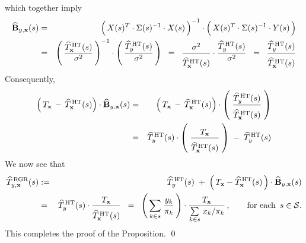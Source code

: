 which together imply
\begin{eqnarray*}
\widehat{\mathbf{B}}_{y,\mathbf{x}}(s)
& = &
	\left(\,X(s)^{T} \overset{{\color{white}!}}{\cdot} \Sigma(s)^{-1} \cdot X(s)\,\right)^{-1}
	\cdot
	\left(\,X(s)^{T} \overset{{\color{white}!}}{\cdot} \Sigma(s)^{-1} \cdot Y(s) \,\right)
\\
& = &
	\left(\, \dfrac{ \widehat{T}^{\,\textnormal{HT}}_{\mathbf{x}}(s) }{\sigma^{2}} \,\right)^{-1}
	\cdot
	\left(\,
		\dfrac{\widehat{T}^{\,\textnormal{HT}}_{y}(s)}{\sigma^{2}}
	\,\right)
\;\; = \;\;
	\dfrac{\sigma^{2}}{\overset{{\color{white}.}}{\widehat{T}^{\,\textnormal{HT}}_{\mathbf{x}}(s)}}
	\cdot
	\dfrac{\widehat{T}^{\,\textnormal{HT}}_{y}(s)}{\sigma^{2}}
\;\; = \;\;
	\dfrac{
		\widehat{T}^{\,\textnormal{HT}}_{y}(s)
	}{
		\overset{{\color{white}.}}{\widehat{T}^{\,\textnormal{HT}}_{\mathbf{x}}(s)}
	}
\end{eqnarray*}
Consequently,
\begin{eqnarray*}
\left(\,T_{\mathbf{x}} \,-\, \widehat{T}^{\,\textnormal{HT}}_{\mathbf{x}}(s)\right)
\cdot
\widehat{\mathbf{B}}_{y,\mathbf{x}}(s)
& = &
	\left(\,T_{\mathbf{x}} \,-\, \widehat{T}^{\,\textnormal{HT}}_{\mathbf{x}}(s)\right)
	\cdot
	\left(\;
		\dfrac{
			\widehat{T}^{\,\textnormal{HT}}_{y}(s)
		}{
			\overset{{\color{white}.}}{\widehat{T}^{\,\textnormal{HT}}_{\mathbf{x}}(s)}
		}
	\;\right)
\\
& = &
	\widehat{T}^{\,\textnormal{HT}}_{y}(s)
	\cdot
	\left(\;
		\dfrac{
			T_{\mathbf{x}}
		}{
			\overset{{\color{white}.}}{\widehat{T}^{\,\textnormal{HT}}_{\mathbf{x}}(s)}
		}
	\;\right)
	\; - \;
	\widehat{T}^{\,\textnormal{HT}}_{y}(s)
\end{eqnarray*}
We now see that
\begin{eqnarray*}
\widehat{T}^{\,\textnormal{RGR}}_{y,\mathbf{x}}(s)
& := &
	\widehat{T}^{\,\textnormal{HT}}_{y}(s)
	\; + \;
	\left(\,T_{\mathbf{x}} - \widehat{T}^{\,\textnormal{HT}}_{\mathbf{x}}(s) \,\right)
	\cdot
	\widehat{\mathbf{B}}_{y,\mathbf{x}}(s)
\\
& = &
	\widehat{T}^{\,\textnormal{HT}}_{y}(s)
	\cdot
	\dfrac{
		T_{\mathbf{x}}
		}{
		\overset{{\color{white}.}}{\widehat{T}^{\,\textnormal{HT}}_{\mathbf{x}}(s)}
		}
\;\; = \;\;
	\left(\,\underset{k \in s}{\sum}\;\dfrac{y_{k}}{\pi_{k}}\,\right)
	\cdot
 	\dfrac{
		T_{\mathbf{x}}
		}{
		\underset{k \in s}{\sum}\;x_{k}/\pi_{k}
		}
	\,,\quad\quad\textnormal{for each \,$s \in \mathcal{S}$}.
\end{eqnarray*}
This completes the proof of the Proposition.
\qed


\renewcommand{\theenumi}{\roman{enumi}}
\renewcommand{\labelenumi}{\textnormal{(\theenumi)}$\;\;$}

